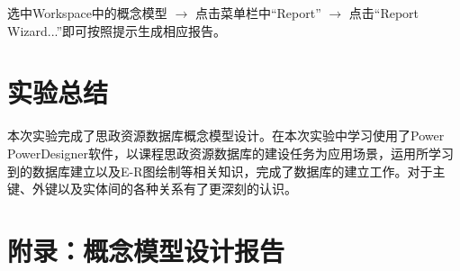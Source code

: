 \documentclass[11pt]{article}
\begin{document}

  选中Workspace中的概念模型 $\rightarrow$ 点击菜单栏中“Report” $\rightarrow$ 点击“Report Wizard...”即可按照提示生成相应报告。




% 

% 

% 



  \pagebreak
  \section{实验总结}
  本次实验完成了思政资源数据库概念模型设计。在本次实验中学习使用了Power PowerDesigner软件，以课程思政资源数据库的建设任务为应用场景，运用所学习到的数据库建立以及E-R图绘制等相关知识，完成了数据库的建立工作。对于主键、外键以及实体间的各种关系有了更深刻的认识。
  
  \appendix
  \lstset{
	  numbers=left,
  }
  \pagebreak
  \section{附录：概念模型设计报告}
  \label{apd:CDM}
  \begin{figure}[h]
    \centering
    
  \end{figure}
  \pagebreak
  \begin{figure}[h]
    \centering
    
  \end{figure}
\end{document}
